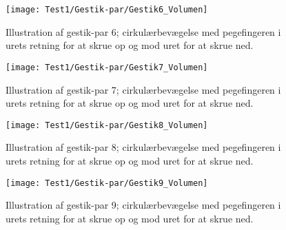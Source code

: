 \noindent
%
%
\begin{figure}[H]
	\centering
	\texttt{[image: Test1/Gestik-par/Gestik6\_Volumen]}
	\caption{Illustration af gestik-par 6; cirkulærbevægelse med pegefingeren i urets retning for at skrue op og mod uret for at skrue ned.}
	\label{fig:GestikPar6VolumenApp}
\end{figure}
\noindent
%
%
\begin{figure}[H]
	\centering
	\texttt{[image: Test1/Gestik-par/Gestik7\_Volumen]}
	\caption{Illustration af gestik-par 7; cirkulærbevægelse med pegefingeren i urets retning for at skrue op og mod uret for at skrue ned.}
	\label{fig:GestikPar7VolumenApp}
\end{figure}
\noindent
%
%
\begin{figure}[H]
	\centering
	\texttt{[image: Test1/Gestik-par/Gestik8\_Volumen]}
	\caption{Illustration af gestik-par 8; cirkulærbevægelse med pegefingeren i urets retning for at skrue op og mod uret for at skrue ned.}
	\label{fig:GestikPar8VolumenApp}
\end{figure}
\noindent
%
%
\begin{figure}[H]
	\centering
	\texttt{[image: Test1/Gestik-par/Gestik9\_Volumen]}
	\caption{Illustration af gestik-par 9; cirkulærbevægelse med pegefingeren i urets retning for at skrue op og mod uret for at skrue ned.}
	\label{fig:GestikPar9VolumenApp}
\end{figure}
\noindent
%